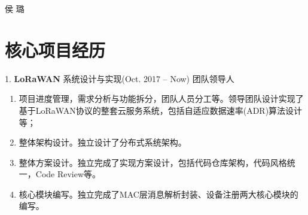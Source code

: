 \documentclass[10pt]{article} %
\begin{document}
\begin{paracol}{2} %
	
	
	\parbox[top][0.12\textheight][c]{\linewidth}{ %
		\vspace{-0.04\textheight} %
		\centering %
		{\Huge 侯 璐}\\\medskip %
		{\Huge{}}
	}
	
	
	\section{核心项目经历}
	
	
	
	
	\chsworkposition{} %
	{} %
	{1. \textbf{LoRaWAN\texttrademark} 系统设计与实现(Oct. 2017 -- Now)} %
	{ 团队领导人} %
	{\begin{enumerate}
		\item 项目进度管理，需求分析与功能拆分，团队人员分工等。领导团队设计实现了基于LoRaWAN\texttrademark 协议的整套云服务系统，包括自适应数据速率(ADR)算法设计等；
		\item 整体架构设计。独立设计了分布式系统架构。
		
		\item 整体方案设计。独立完成了实现方案设计，包括代码仓库架构，代码风格统一，Code Review等。
		
		\item 核心模块编写。独立完成了MAC层消息解析封装、设备注册两大核心模块的编写。
		

\end{enumerate}}
\end{paracol}
\end{document}
